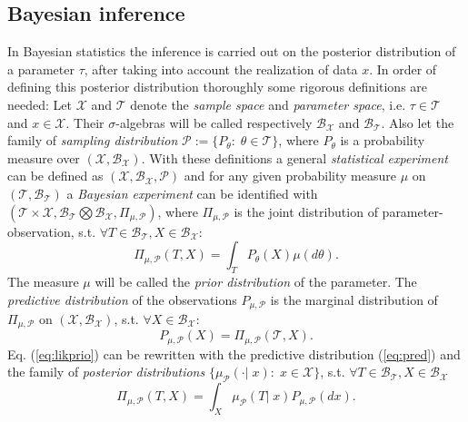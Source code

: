 \documentclass[12pt,letterpaper]{article}
\begin{document}
\subsection{Bayesian inference}
\label{sec:BayInf}
In Bayesian statistics the inference is carried out on the posterior distribution of a parameter $\tau$, after taking into account the realization of data $x$. In order of defining this posterior distribution thoroughly some rigorous definitions are needed:
Let $\mathcal{X}$ and $\mathcal{T}$ denote the \textit{sample space} and \textit{parameter space}, i.e. $\tau \in \mathcal{T}$ and $x \in \mathcal{X}$. Their $\sigma$-algebras will be called respectively $\mathcal{B}_\mathcal{X}$ and $\mathcal{B}_\mathcal{T}$. Also let the family of \textit{sampling distribution} $\mathcal{P} := \{P_\theta :\;\theta \in \mathcal{T}\}$, where $P_\theta$ is a probability measure over $(\mathcal{X}, \mathcal{B}_\mathcal{X})$. With these definitions a general \textit{statistical experiment} can be defined as $(\mathcal{X}, \mathcal{B}_\mathcal{X}, \mathcal{P})$ and for any given probability measure $\mu$ on $(\mathcal{T}, \mathcal{B}_\mathcal{T})$ a \textit{Bayesian experiment} can be identified with $(\mathcal{T}\times\mathcal{X},  \mathcal{B}_\mathcal{T}\bigotimes\mathcal{B}_\mathcal{X}, \Pi_{\mu,\mathcal{P}})$, where $\Pi_{\mu,\mathcal{P}}$ is the joint distribution of parameter-observation, s.t. $\forall T \in \mathcal{B}_\mathcal{T}, X \in \mathcal{B}_\mathcal{X}$:
\begin{equation}
\label{eq:likprio}
\Pi_{\mu,\mathcal{P}}(T,X) = \int_T P_\theta(X)\mu(d\theta ). 
\end{equation} 
The measure $\mu$ will be called the \textit{prior distribution} of the parameter. The \textit{predictive distribution} of the observations $P_{\mu,\mathcal{P}}$ is the marginal distribution of $\Pi_{\mu,\mathcal{P}}$ on $(\mathcal{X}, \mathcal{B}_\mathcal{X})$, s.t. $\forall X \in \mathcal{B}_\mathcal{X}: $
\begin{equation}
P_{\mu,\mathcal{P}}(X) = \Pi_{\mu,\mathcal{P}}(\mathcal{T},X).
\label{eq:pred}
\end{equation}
Eq. (\ref{eq:likprio}) can be rewritten with the predictive distribution (\ref{eq:pred}) and the family of \textit{posterior distributions} $\{\mu_\mathcal{P}(\cdot |\; x):\; x\in\mathcal{X}\}$, s.t. $\forall T \in \mathcal{B}_\mathcal{T}, X \in \mathcal{B}_\mathcal{X}$
\begin{equation}
\label{eq:post}
\Pi_{\mu,\mathcal{P}}(T,X) = \int_X \mu_\mathcal{P}(T|\; x) P_{\mu,\mathcal{P}}(dx ). 
\end{equation} 
\end{document}
